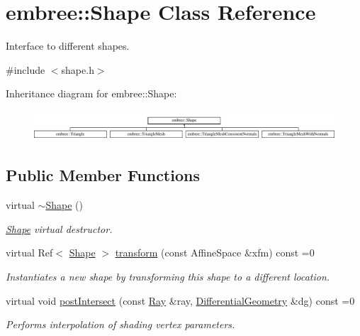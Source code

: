 \hypertarget{classembree_1_1_shape}{
\section{embree::Shape Class Reference}
\label{classembree_1_1_shape}
}


Interface to different shapes.  




{\ttfamily \#include $<$shape.h$>$}

Inheritance diagram for embree::Shape:\begin{figure}[H]
\begin{center}
\leavevmode
\includegraphics[height=1.124498cm]{classembree_1_1_shape}
\end{center}
\end{figure}
\subsection*{Public Member Functions}
\begin{DoxyCompactItemize}
\item 
virtual \hyperlink{classembree_1_1_shape_ac3ffc89a90af933f648c404eecc0121f}{$\sim$Shape} ()
\begin{DoxyCompactList}\small\item\em \hyperlink{classembree_1_1_shape}{Shape} virtual destructor. \item\end{DoxyCompactList}\item 
virtual Ref$<$ \hyperlink{classembree_1_1_shape}{Shape} $>$ \hyperlink{classembree_1_1_shape_a33a3df726fed0bf3e6e36da428091305}{transform} (const AffineSpace \&xfm) const =0
\begin{DoxyCompactList}\small\item\em Instantiates a new shape by transforming this shape to a different location. \item\end{DoxyCompactList}\item 
virtual void \hyperlink{classembree_1_1_shape_ad8890936622a2208c2b418484731d776}{postIntersect} (const \hyperlink{structembree_1_1_ray}{Ray} \&ray, \hyperlink{structembree_1_1_differential_geometry}{DifferentialGeometry} \&dg) const =0
\begin{DoxyCompactList}\small\item\em Performs interpolation of shading vertex parameters. \item\end{DoxyCompactList}\end{DoxyCompactItemize}


